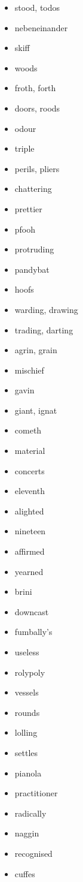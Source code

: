 \documentclass{article}
\begin{document}
\begin{itemize}
    \item stood, todos
    \item nebeneinander
    \item skiff
    \item woods
    \item froth, forth
    \item doors, roods
    \item odour
    \item triple
    \item perils, pliers
    \item chattering
    \item prettier
    \item pfooh
    \item protruding
    \item pandybat
    \item hoofs
    \item warding, drawing
    \item trading, darting
    \item agrin, grain
    \item mischief
    \item gavin
    \item giant, ignat
    \item cometh
    \item material
    \item concerts
    \item eleventh
    \item alighted
    \item nineteen
    \item affirmed
    \item yearned
    \item brini
    \item downcast
    \item fumbally's
    \item useless
    \item rolypoly
    \item vessels
    \item rounds
    \item lolling
    \item settles
    \item pianola
    \item practitioner
    \item radically
    \item naggin
    \item recognised
    \item cuffes

\end{itemize}
\end{document}
